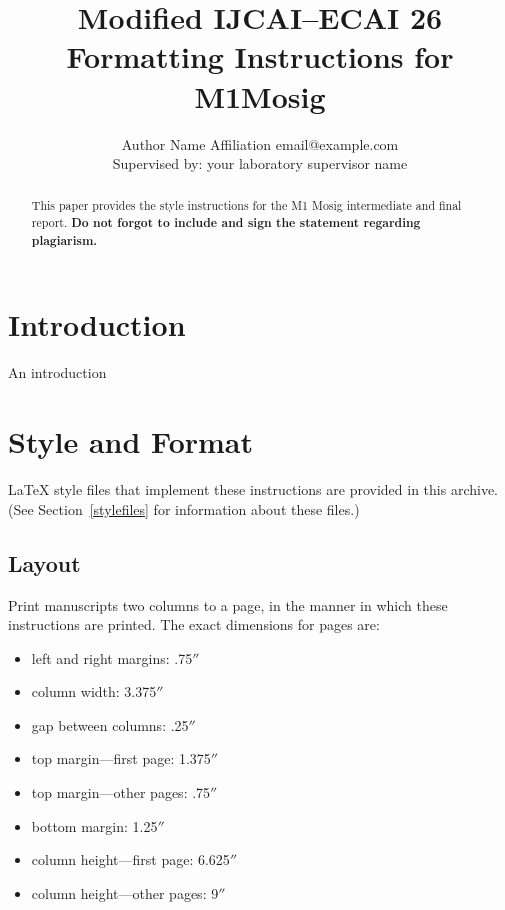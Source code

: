 \documentclass{article}
\title{Modified IJCAI--ECAI 26 Formatting Instructions for M1Mosig}
\author{
    Author Name
    \affiliations
    Affiliation
    \emails
    email@example.com\\
    Supervised by: your laboratory supervisor name
}
\begin{document}
\maketitle


{%
}



\begin{abstract}
   This paper provides the style instructions for the M1 Mosig intermediate and final report. \textbf{Do not forgot to include and sign the statement regarding plagiarism.}
\end{abstract}

\section{Introduction}

An introduction


\section{Style and Format}

\LaTeX{} style files that implement these instructions are provided in this archive. (See Section~\ref{stylefiles} for
information about these files.)

\subsection{Layout}

Print manuscripts two columns to a page, in the manner in which these
instructions are printed. The exact dimensions for pages are:
\begin{itemize}
    \item left and right margins: .75$''$
    \item column width: 3.375$''$
    \item gap between columns: .25$''$
    \item top margin---first page: 1.375$''$
    \item top margin---other pages: .75$''$
    \item bottom margin: 1.25$''$
    \item column height---first page: 6.625$''$
    \item column height---other pages: 9$''$
\end{itemize}
\end{document}
